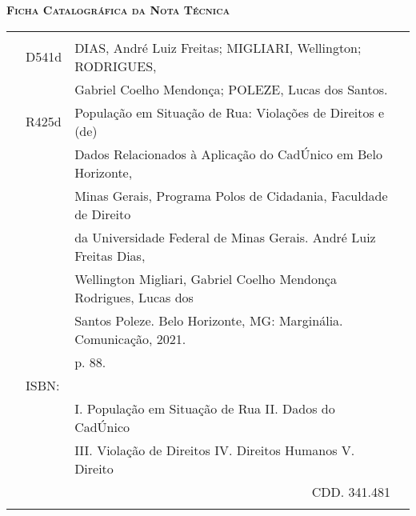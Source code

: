 \documentclass[12pt]{article}
\begin{document}
\thispagestyle{empty}
\vspace{5cm}
{\textsc\textbf{Ficha Catalográfica da Nota Técnica}}
\begin{table}[htbp]
    \centering
\vspace{4cm}
    	\tabcolsep=0.15cm
	\renewcommand{\arraystretch}{1.2}
	\begin{adjustbox}{max width=\linewidth}
    \begin{tabular}{|rrrr|}
    \hline
         &      &      &  \\
         & \multicolumn{1}{l}{D541d} & \multicolumn{1}{l}{DIAS, André Luiz Freitas; MIGLIARI, Wellington; RODRIGUES,} &  \\
         & \multicolumn{1}{l}{} 	    & \multicolumn{1}{l}{Gabriel Coelho Mendonça; POLEZE, Lucas dos Santos.} &  \\
         & \multicolumn{1}{l}{R425d} & \multicolumn{1}{l}{População em Situação de Rua: Violações de Direitos e (de)} &  \\
         & \multicolumn{1}{l}{} &  \multicolumn{1}{l}{Dados Relacionados à Aplicação do CadÚnico em Belo Horizonte,} &  \\
         & \multicolumn{1}{l}{} &  \multicolumn{1}{l}{Minas Gerais, Programa Polos de Cidadania, Faculdade de Direito} &  \\
         & \multicolumn{1}{l}{} &  \multicolumn{1}{l}{da Universidade Federal de Minas Gerais. André Luiz Freitas Dias,} &  \\
         & \multicolumn{1}{l}{} &  \multicolumn{1}{l}{Wellington Migliari, Gabriel Coelho Mendonça Rodrigues, Lucas dos} &  \\
         & \multicolumn{1}{l}{} &  \multicolumn{1}{l}{Santos Poleze. Belo Horizonte, MG: Marginália. Comunicação, 2021.} &  \\
         & \multicolumn{1}{l}{} &  \multicolumn{1}{l}{p. 88.} &  \\
         & \multicolumn{1}{l}{ISBN:} &      &  \\
         & \multicolumn{1}{l}{} & \multicolumn{1}{l}{I. População em Situação de Rua II. Dados do CadÚnico} &  \\
         & \multicolumn{1}{l}{} & \multicolumn{1}{l}{III. Violação de Direitos IV. Direitos Humanos V. Direito} &  \\
         & \multicolumn{1}{l}{} & CDD. 341.481 &  \\
         &      &      &  \\
    \hline
    \end{tabular}%
     \end{adjustbox}
  \label{tab:addlabel}%
\end{table}%
\end{document}
